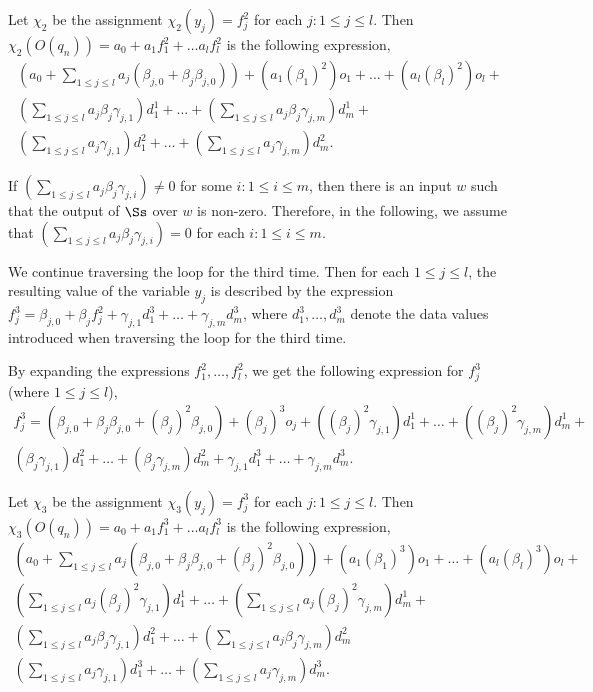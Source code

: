 Let $\chi_2$ be the assignment $\chi_2(y_j)=f^2_j$ for each $j: 1\le j \le l$.
Then $\chi_2(O(q_n)) = a_0+ a_1 f^2_1 + \dots a_l f^2_l$ is the following expression,
\[
\begin{array}{l}
(a_0 + \sum \limits_{1 \le j \le l} a_j (\beta_{j,0} + \beta_{j} \beta_{j,0})) +  (a_1 (\beta_1)^2) o_1 + \dots + (a_l (\beta_l)^2) o_l + \\
 (\sum \limits_{1 \le j \le l} a_j \beta_{j}\gamma_{j,1}) d^1_1 + \dots + (\sum \limits_{1 \le j \le l} a_j \beta_{j}\gamma_{j,m}) d^1_m + \\
(\sum \limits_{1 \le j \le l} a_j \gamma_{j,1}) d^2_1 + \dots + (\sum \limits_{1 \le j \le l} a_j \gamma_{j,m}) d^2_m.
\end{array}
\]

If $(\sum \limits_{1 \le j \le l} a_j \beta_j\gamma_{j,i}) \neq 0$ for some $i: 1 \le i \le m$, then there is an input $w$ such that the output of $\Ss$ over $w$ is non-zero. Therefore, in the following, we assume that $(\sum \limits_{1 \le j \le l} a_j \beta_j\gamma_{j,i}) = 0$ for each $i: 1 \le i \le m$.


We continue traversing the loop for the third time. Then for each $1 \le j \le l$,  the resulting value of the variable $y_{j}$ is described by the expression $f^3_{j} = \beta_{j,0} + \beta_{j} f^2_j  + \gamma_{j,1} d^3_1 + \dots + \gamma_{j,m} d^3_m$, where $d^3_1, \dots, d^3_m$ denote the data values introduced when traversing the loop for the third time. 

By expanding the expressions $f^2_1,\dots,f^2_l$, we get the following expression for $f^3_{j}$ (where $1\le j \le l$),
\[
\begin{array}{l}
f^3_{j} = (\beta_{j,0} + \beta_{j} \beta_{j,0} + (\beta_j)^2 \beta_{j,0}) + (\beta_{j})^3 o_{j} +
((\beta_{j})^2\gamma_{j,1}) d^1_1 +\dots + ((\beta_{j})^2\gamma_{j,m}) d^1_m  + \\
(\beta_j \gamma_{j,1}) d^2_1 + \dots + (\beta_j \gamma_{j,m}) d^2_m + \gamma_{j,1} d^3_1 + \dots + \gamma_{j,m} d^3_m.
\end{array}
\]

Let $\chi_3$ be the assignment $\chi_3(y_j)=f^3_j$ for each $j: 1\le j \le l$.
Then $\chi_3(O(q_n)) = a_0+ a_1 f^3_1 + \dots a_l f^3_l$ is the following expression,
\[
\begin{array}{l}
(a_0 + \sum \limits_{1 \le j \le l} a_j (\beta_{j,0} + \beta_{j} \beta_{j,0} + (\beta_j)^2 \beta_{j,0})) +  (a_1 (\beta_1)^3) o_1 + \dots + (a_l (\beta_l)^3) o_l + \\
 (\sum \limits_{1 \le j \le l} a_j (\beta_{j})^2\gamma_{j,1}) d^1_1 + \dots + (\sum \limits_{1 \le j \le l} a_j (\beta_{j})^2\gamma_{j,m}) d^1_m + \\
(\sum \limits_{1 \le j \le l} a_j \beta_j \gamma_{j,1}) d^2_1 + \dots + (\sum \limits_{1 \le j \le l} a_j \beta_j \gamma_{j,m}) d^2_m \\
(\sum \limits_{1 \le j \le l} a_j \gamma_{j,1}) d^3_1 + \dots + (\sum \limits_{1 \le j \le l} a_j \gamma_{j,m}) d^3_m. 
\end{array}
\]

